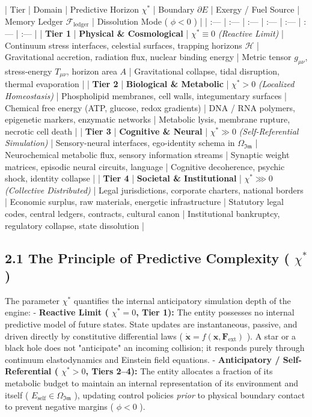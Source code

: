 \documentclass[11pt,a4paper]{article}
\theoremstyle{definition}
\theoremstyle{remark}
\begin{document}
| Tier | Domain | Predictive Horizon $\chi^*$ | Boundary $\partial E$ | Exergy / Fuel Source | Memory Ledger $\mathcal{F}_{\text{ledger}}$ | Dissolution Mode ( $\phi < 0$ ) |
| :--- | :--- | :--- | :--- | :--- | :--- | :--- |
| \textbf{Tier 1} | \textbf{Physical \& Cosmological} | $\chi^* \equiv 0$ \textit{(Reactive Limit)} | Continuum stress interfaces, celestial surfaces, trapping horizons $\mathcal{H}$ | Gravitational accretion, radiation flux, nuclear binding energy | Metric tensor $g_{\mu\nu}$, stress-energy $T_{\mu\nu}$, horizon area $A$ | Gravitational collapse, tidal disruption, thermal evaporation |
| \textbf{Tier 2} | \textbf{Biological \& Metabolic} | $\chi^* > 0$ \textit{(Localized Homeostasis)} | Phospholipid membranes, cell walls, integumentary surfaces | Chemical free energy (ATP, glucose, redox gradients) | DNA / RNA polymers, epigenetic markers, enzymatic networks | Metabolic lysis, membrane rupture, necrotic cell death |
| \textbf{Tier 3} | \textbf{Cognitive \& Neural} | $\chi^* \gg 0$ \textit{(Self-Referential Simulation)} | Sensory-neural interfaces, ego-identity schema in $\Omega_{\mathfrak{Im}}$ | Neurochemical metabolic flux, sensory information streams | Synaptic weight matrices, episodic neural circuits, language | Cognitive decoherence, psychic shock, identity collapse |
| \textbf{Tier 4} | \textbf{Societal \& Institutional} | $\chi^* \ggg 0$ \textit{(Collective Distributed)} | Legal jurisdictions, corporate charters, national borders | Economic surplus, raw materials, energetic infrastructure | Statutory legal codes, central ledgers, contracts, cultural canon | Institutional bankruptcy, regulatory collapse, state dissolution |

\subsection{2.1 The Principle of Predictive Complexity ( $\chi^*$ )}
The parameter $\chi^*$ quantifies the internal anticipatory simulation depth of the engine:
- \textbf{Reactive Limit ( $\chi^* = 0$, Tier 1):} The entity possesses no internal predictive model of future states. State updates are instantaneous, passive, and driven directly by constitutive differential laws ( $\dot{\mathbf{x}} = f(\mathbf{x}, \mathbf{F}_{\text{ext}})$ ). A star or a black hole does not "anticipate" an incoming collision; it responds purely through continuum elastodynamics and Einstein field equations.
- \textbf{Anticipatory / Self-Referential ( $\chi^* > 0$, Tiers 2–4):} The entity allocates a fraction of its metabolic budget to maintain an internal representation of its environment and itself ( $E_{\text{self}} \in \Omega_{\mathfrak{Im}}$ ), updating control policies \textit{prior} to physical boundary contact to prevent negative margins ( $\phi < 0$ ).
\end{document}
